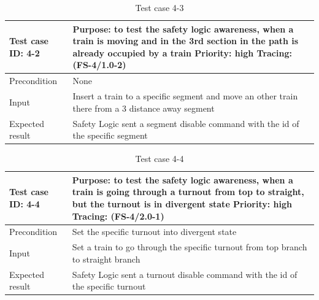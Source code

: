 \begin{table}[H]
	\caption{Test case 4-3}
	\label{table:TCase-FS4-3}
	\begin{center}
		\renewcommand{\arraystretch}{1.8}
		\begin{tabu} 
			to 0.9 \textwidth
			{  X[0.4, c] X[c] }
			\toprule
			Test case ID: 4-2 & Purpose: to test the safety logic awareness, when a train is moving and in the 3rd section in the path is already occupied by a train \newline Priority: high \newline Tracing: (FS-4/1.0-2)\\ \midrule
			Precondition & None  \\
			Input & Insert a train to a specific segment and move an other train there from a 3 distance away segment\\
			Expected result & Safety Logic sent a segment disable command with the id of the specific segment \\ \bottomrule
		\end{tabu}
	\end{center}
\end{table} 

\begin{table}[H]
	\caption{Test case 4-4}
	\label{table:TCase-FS4-4}
	\begin{center}
		\renewcommand{\arraystretch}{1.8}
		\begin{tabu} 
			to 0.9 \textwidth
			{  X[0.4, c] X[c] }
			\toprule
			Test case ID: 4-4 & Purpose: to test the safety logic awareness, when a train is going through a turnout from top to straight, but the turnout is in divergent state \newline Priority: high \newline Tracing: (FS-4/2.0-1)\\ \midrule
			Precondition & Set the specific turnout into divergent state  \\
			Input & Set a train to go through the specific turnout from top branch to straight branch \\
			Expected result & Safety Logic sent a turnout disable command with the id of the specific turnout \\ \bottomrule
		\end{tabu}
	\end{center}
\end{table} 



